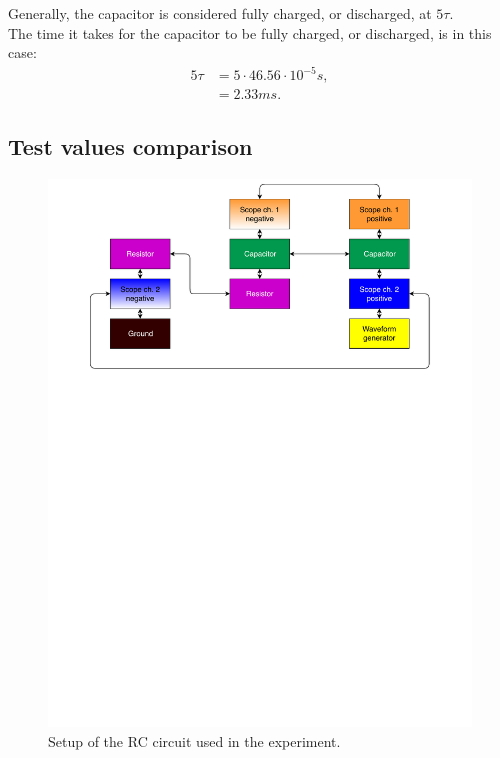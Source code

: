 \noindent Generally, the capacitor is considered fully charged, or discharged, at $5\tau$. \\
The time it takes for the capacitor to be fully charged, or discharged, is in this case:
\begin{align*}
5\tau &= 5 \cdot 46.56 \cdot 10^{-5} s, \\
&= 2.33 ms.
\end{align*}

\subsection{Test values comparison}
\begin{figure}[H]
	\center
		\includegraphics[clip, trim=0cm 18cm 0cm 0cm, scale=0.6]{fig/img/test_circuit_1}
	\caption{Setup of the RC circuit used in the experiment.}
	\label{rc_flow}
\end{figure}
